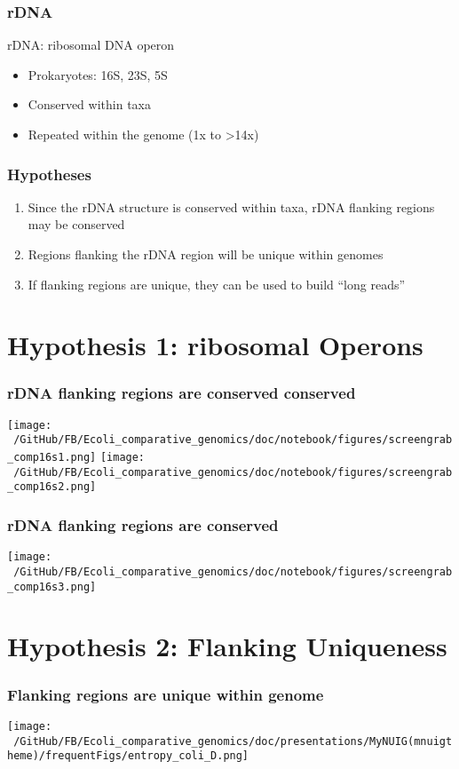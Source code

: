 \documentclass[10pt, compress]{beamer}
\begin{document}
\begin{frame}[fragile]
  \frametitle{rDNA}
  rDNA: ribosomal DNA operon
  \begin{itemize}
    \item Prokaryotes: 16S, 23S, 5S
    \item Conserved within taxa
    \item Repeated within the genome (1x to >14x)
    \end{itemize}
\end{frame}

\begin{frame}[fragile]
\frametitle{Hypotheses}
  \begin{enumerate}
  \item Since the rDNA structure is conserved within taxa, rDNA flanking regions may be conserved
  \item Regions flanking the rDNA region will be unique within genomes
  \item If flanking regions are unique, they can be used to build ``long reads''
\end{enumerate}
\end{frame}
\section{Hypothesis 1: ribosomal Operons}

\begin{frame}[fragile]
  \frametitle{rDNA flanking regions are conserved conserved}
  \centering
  \texttt{[image: ~/GitHub/FB/Ecoli\_comparative\_genomics/doc/notebook/figures/screengrab\_comp16s1.png]}
  \hfill
  \texttt{[image: ~/GitHub/FB/Ecoli\_comparative\_genomics/doc/notebook/figures/screengrab\_comp16s2.png]}
\end{frame}
\begin{frame}[fragile]
  \frametitle{rDNA flanking regions are conserved}
  \hspace*{1cm}
  \texttt{[image: ~/GitHub/FB/Ecoli\_comparative\_genomics/doc/notebook/figures/screengrab\_comp16s3.png]}
\end{frame}

\section{Hypothesis 2: Flanking Uniqueness}

\begin{frame}[fragile]
  \frametitle{Flanking regions are unique within genome}
  \hspace*{-1cm}
  \texttt{[image: ~/GitHub/FB/Ecoli\_comparative\_genomics/doc/presentations/MyNUIG(mnuigtheme)/frequentFigs/entropy\_coli\_D.png]}
\end{frame}
\end{document}
